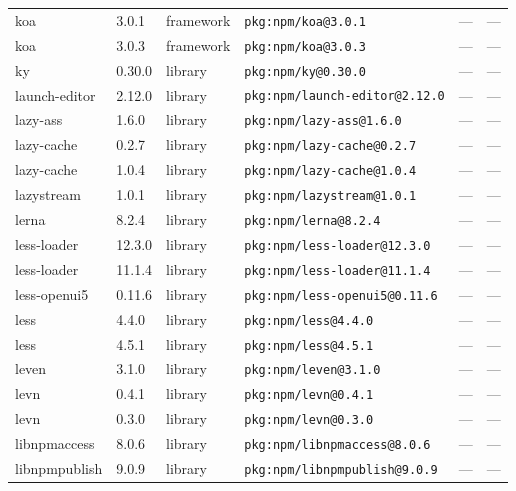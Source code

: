 \documentclass[11pt,a4paper]{article}
\begin{document}
\begin{longtable}{|p{4cm}|p{2cm}|p{1.6cm}|p{5cm}|p{1.5cm}|p{3.5cm}|}
\raggedright koa & 3.0.1 & framework & \small\texttt{pkg:npm/koa@3.0.1} & — & \small — \\
\raggedright koa & 3.0.3 & framework & \small\texttt{pkg:npm/koa@3.0.3} & — & \small — \\
\raggedright ky & 0.30.0 & library & \small\texttt{pkg:npm/ky@0.30.0} & — & \small — \\
\raggedright launch-editor & 2.12.0 & library & \small\texttt{pkg:npm/launch-editor@2.12.0} & — & \small — \\
\raggedright lazy-ass & 1.6.0 & library & \small\texttt{pkg:npm/lazy-ass@1.6.0} & — & \small — \\
\raggedright lazy-cache & 0.2.7 & library & \small\texttt{pkg:npm/lazy-cache@0.2.7} & — & \small — \\
\raggedright lazy-cache & 1.0.4 & library & \small\texttt{pkg:npm/lazy-cache@1.0.4} & — & \small — \\
\raggedright lazystream & 1.0.1 & library & \small\texttt{pkg:npm/lazystream@1.0.1} & — & \small — \\
\raggedright lerna & 8.2.4 & library & \small\texttt{pkg:npm/lerna@8.2.4} & — & \small — \\
\raggedright less-loader & 12.3.0 & library & \small\texttt{pkg:npm/less-loader@12.3.0} & — & \small — \\
\raggedright less-loader & 11.1.4 & library & \small\texttt{pkg:npm/less-loader@11.1.4} & — & \small — \\
\raggedright less-openui5 & 0.11.6 & library & \small\texttt{pkg:npm/less-openui5@0.11.6} & — & \small — \\
\raggedright less & 4.4.0 & library & \small\texttt{pkg:npm/less@4.4.0} & — & \small — \\
\raggedright less & 4.5.1 & library & \small\texttt{pkg:npm/less@4.5.1} & — & \small — \\
\raggedright leven & 3.1.0 & library & \small\texttt{pkg:npm/leven@3.1.0} & — & \small — \\
\raggedright levn & 0.4.1 & library & \small\texttt{pkg:npm/levn@0.4.1} & — & \small — \\
\raggedright levn & 0.3.0 & library & \small\texttt{pkg:npm/levn@0.3.0} & — & \small — \\
\raggedright libnpmaccess & 8.0.6 & library & \small\texttt{pkg:npm/libnpmaccess@8.0.6} & — & \small — \\
\raggedright libnpmpublish & 9.0.9 & library & \small\texttt{pkg:npm/libnpmpublish@9.0.9} & — & \small — \\

\end{longtable}
\end{document}
